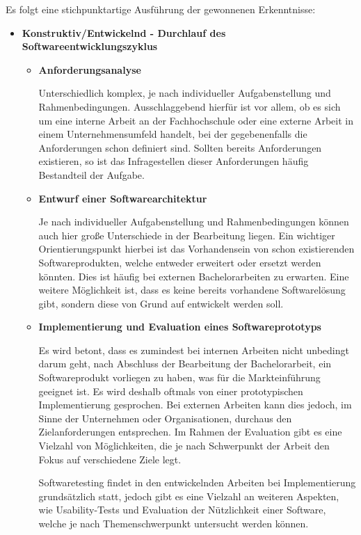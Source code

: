 \documentclass{scrreprt}
\begin{document}
\par Es folgt eine stichpunktartige Ausführung der gewonnenen Erkenntnisse:

\begin{itemize}
\item \textbf{Konstruktiv/Entwickelnd - Durchlauf des Softwareentwicklungszyklus}
	\begin{itemize}
	\item \textbf{Anforderungsanalyse}
	\par Unterschiedlich komplex, je nach individueller Aufgabenstellung und 
	Rahmenbedingungen. Ausschlaggebend hierfür ist vor allem, ob es sich um eine interne 
	Arbeit an der Fachhochschule oder eine externe Arbeit in einem 	
	Unternehmensumfeld handelt, bei der gegebenenfalls die Anforderungen schon definiert sind. 	
	Sollten bereits Anforderungen existieren, so ist das Infragestellen dieser Anforderungen 
	häufig Bestandteil der Aufgabe. 
	\item \textbf{Entwurf einer Softwarearchitektur}
	\par Je nach individueller Aufgabenstellung und Rahmenbedingungen können auch hier große 
	Unterschiede in der Bearbeitung liegen. Ein wichtiger Orientierungspunkt hierbei ist das 
	Vorhandensein von schon existierenden Softwareprodukten, welche entweder erweitert oder 
	ersetzt	werden könnten. Dies ist häufig bei externen Bachelorarbeiten zu erwarten. 
	Eine weitere Möglichkeit ist, dass es keine bereits vorhandene Softwarelösung gibt, 
	sondern diese von Grund auf entwickelt werden soll.
	\item \textbf{Implementierung und Evaluation eines Softwareprototyps}
	\par Es wird betont, dass es zumindest bei internen Arbeiten nicht unbedingt darum geht, 
	nach Abschluss der Bearbeitung der Bachelorarbeit, ein Softwareprodukt vorliegen zu haben, 
	was für die Markteinführung geeignet ist. Es wird deshalb oftmals von einer prototypischen 
	Implementierung gesprochen. Bei externen Arbeiten kann dies jedoch, im Sinne der Unternehmen 
	oder Organisationen, durchaus den Zielanforderungen entsprechen. Im Rahmen der Evaluation 
	gibt es eine Vielzahl von Möglichkeiten, die je nach Schwerpunkt der Arbeit den Fokus auf 
	verschiedene Ziele legt. 
	\par Softwaretesting findet in den entwickelnden Arbeiten bei 
	Implementierung grundsätzlich statt, jedoch gibt es eine Vielzahl an weiteren Aspekten, wie 
	Usability-Tests und Evaluation der Nützlichkeit einer Software, welche je nach 
	Themenschwerpunkt untersucht werden können.

\end{itemize}
\end{itemize}
\end{document}
